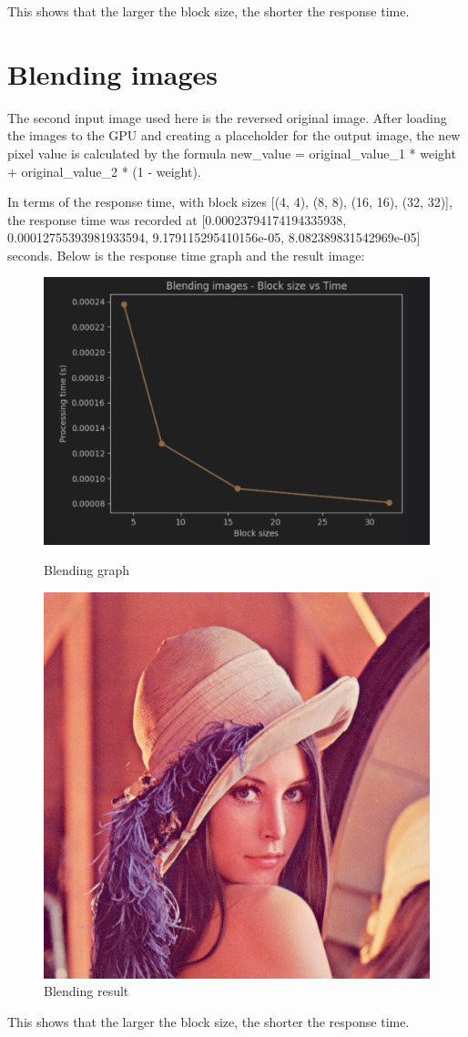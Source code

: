 \documentclass{article}
\begin{document}
This shows that the larger the block size, the shorter the response time.

\section{Blending images}

The second input image used here is the reversed original image. After loading the images to the GPU and creating a placeholder for the output image, the new pixel value is calculated by the formula new\_value = original\_value\_1 * weight + original\_value\_2 * (1 - weight).

In terms of the response time, with block sizes [(4, 4), (8, 8), (16, 16), (32, 32)], the response time was recorded at [0.00023794174194335938, 0.00012755393981933594, 9.179115295410156e-05, 8.082389831542969e-05] seconds. Below is the response time graph and the result image:

\begin{figure}[H]
    \begin{minipage}{0.48\textwidth}
        \centering
        \includegraphics[width=.7\linewidth]{Blending images - Block size vs Time.png}
        \caption{Blending graph}
        \label{fig:Blending graph}
    \end{minipage}\hfill
    \begin{minipage}{0.48\textwidth}
        \centering
        \includegraphics[width=.7\linewidth]{blending_images.png}
        \caption{Blending result}
        \label{fig:Blending result}
    \end{minipage}\hfill
\end{figure}

This shows that the larger the block size, the shorter the response time.
\end{document}
